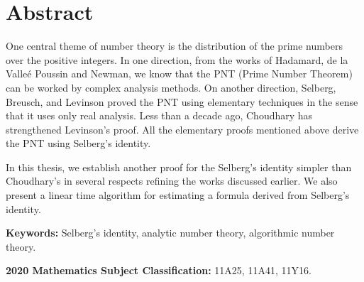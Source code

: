 \chapter*{Abstract}
One central theme of number theory is the distribution
of the prime numbers over the positive integers.
In one direction,
from the works of
Hadamard, de la Valle\'e Poussin and Newman,
we know that the PNT (Prime Number Theorem)
can be worked by complex analysis methods.
On another direction,
Selberg, Breusch, and Levinson proved the PNT
using elementary techniques in the sense that
it uses only real analysis.
Less than a decade ago,
Choudhary has strengthened Levinson's proof.
All the elementary proofs mentioned above
derive the PNT using Selberg's identity.

In this thesis,
we establish another proof for the Selberg's identity
simpler than Choudhary's in several respects
refining the works discussed earlier.
We also present a linear time algorithm for
estimating a formula derived from Selberg's identity.

\bigskip
\textbf{Keywords:}
Selberg's identity,
analytic number theory,
algorithmic number theory.

\bigskip
\textbf{2020 Mathematics Subject Classification:}
11A25,
11A41,
11Y16.
